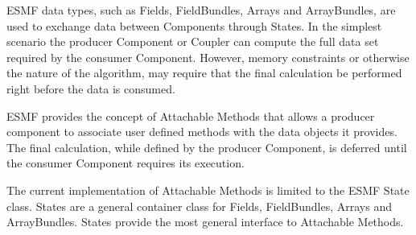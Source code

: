 %


ESMF data types, such as Fields, FieldBundles, Arrays and ArrayBundles, are used
to exchange data between Components through States. In the simplest
scenario the producer Component or Coupler can compute the full data set
required by the consumer Component. However, memory constraints or otherwise
the nature of the algorithm, may require that the final calculation be
performed right before the data is consumed. 

ESMF provides the concept of Attachable Methods that allows a producer 
component to associate user defined methods with the data objects it provides.
The final calculation, while defined by the producer Component, is deferred
until the consumer Component requires its execution.

The current implementation of Attachable Methods is limited to the ESMF State
class. States are a general container class for Fields, FieldBundles, Arrays
and ArrayBundles. States provide the most general interface to Attachable
Methods.
